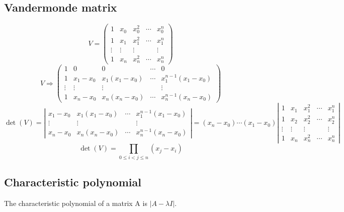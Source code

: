 \documentclass{article}
\begin{document}
    \subsection*{Vandermonde matrix}
    \begin{equation*}
        V=\left(\begin{matrix}
            1 & x_0 & x_0^2 & \cdots & x_0^n\\
            1 & x_1 & x_1^2 & \cdots & x_1^n\\
            \vdots & \vdots & \vdots &  & \vdots\\
            1 & x_n & x_n^2 & \cdots &x_n^n
        \end{matrix}\right)
    \end{equation*}
    \begin{equation*}
        V\Rightarrow\left(\begin{matrix}
            1 & 0 & 0 & \cdots & 0\\
            1 & x_1-x_0 & x_1(x_1-x_0) & \cdots & x_1^{n-1}(x_1-x_0)\\
            \vdots & \vdots & \vdots &  & \vdots\\
            1 & x_n-x_0 & x_n(x_n-x_0) & \cdots &x_n^{n-1}(x_n-x_0)
        \end{matrix}\right)
    \end{equation*}
    \begin{equation*}
        \det(V)=\left|\begin{matrix}
             x_1-x_0 & x_1(x_1-x_0) & \cdots & x_1^{n-1}(x_1-x_0)\\
             \vdots & \vdots &  & \vdots\\
             x_n-x_0 & x_n(x_n-x_0) & \cdots &x_n^{n-1}(x_n-x_0)
        \end{matrix}\right|=(x_n-x_0)\cdots(x_1-x_0)\left|\begin{matrix}
            1 & x_1 & x_1^2 & \cdots & x_1^n\\
            1 & x_2 & x_2^2 & \cdots & x_2^n\\
            \vdots & \vdots & \vdots &  & \vdots\\
            1 & x_n & x_n^2 & \cdots &x_n^n
        \end{matrix}\right|
    \end{equation*}
    \begin{equation*}
        \det(V)=\prod_{0\leq i<j\leq n}(x_j-x_i)
    \end{equation*}
    \subsection*{Characteristic polynomial}
    The characteristic polynomial of a matrix A is $|A-\lambda I|$. 
\end{document}
